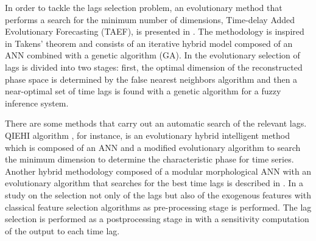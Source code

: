 \documentclass[preprint,authoryear,12pt]{elsarticle}
\begin{document}
In order to tackle the lags selection problem, an evolutionary method that performs a search for the minimum number of dimensions, Time-delay Added Evolutionary Forecasting (TAEF), is presented in \cite{Ferreira2008}. The methodology is inspired in Takens' theorem and consists of an iterative hybrid model composed of an ANN combined with a genetic algorithm (GA). In \cite{Luko2010} the evolutionary selection of lags is divided into two stages: first, the optimal dimension of the reconstructed phase space is determined by the false nearest neighbors algorithm and then a near-optimal set of time lags is found with a genetic algorithm for a fuzzy inference system.

There are some methods that carry out an automatic search of the relevant lags. QIEHI algorithm \cite{Araujo2010a}, for instance, is an evolutionary hybrid intelligent method which is composed of an ANN and a modified evolutionary algorithm to search the minimum dimension to determine the characteristic phase for time series. %
Another hybrid methodology composed of a modular morphological ANN with an evolutionary algorithm that searches for the best time lags is described in \cite{Araujo2010b}. %
In \cite{garcia2008} a study on the selection not only of the lags but also of the exogenous features with classical feature selection algorithms as pre-processing stage is performed. %
The lag selection is performed as a postprocessing stage in \cite{Maus2011} with a sensitivity computation of the output to each time lag. %
\end{document}
